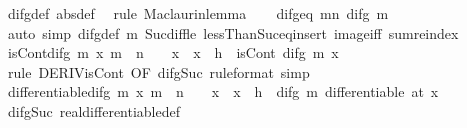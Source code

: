 \begin{isabellebody}
\ difg{\isacharunderscore}{\kern0pt}def\ {\isacharbrackleft}{\kern0pt}abs{\isacharunderscore}{\kern0pt}def{\isacharbrackright}{\kern0pt}\ \isamarkupfalse%
\ {\isacharparenleft}{\kern0pt}rule\ Maclaurin{\isacharunderscore}{\kern0pt}lemma{}{\isacharparenright}{\kern0pt}\isanewline
\ \ \isamarkupfalse%
\ difg{\isacharunderscore}{\kern0pt}eq{\isacharunderscore}{\kern0pt}{}{\isacharcolon}{\kern0pt}\ {\isachardoublequoteopen}{\isasymforall}m{\isacharless}{\kern0pt}n{\isachardot}{\kern0pt}\ difg\ m\ {}\ {\isacharequal}{\kern0pt}\ {}{\isachardoublequoteclose}\isanewline
\ \ \ \ \isamarkupfalse%
\ {\isacharparenleft}{\kern0pt}auto\ simp{\isacharcolon}{\kern0pt}\ difg{\isacharunderscore}{\kern0pt}def\ m\ Suc{\isacharunderscore}{\kern0pt}diff{\isacharunderscore}{\kern0pt}le\ lessThan{\isacharunderscore}{\kern0pt}Suc{\isacharunderscore}{\kern0pt}eq{\isacharunderscore}{\kern0pt}insert{\isacharunderscore}{\kern0pt}{}\ image{\isacharunderscore}{\kern0pt}iff\ sum{\isachardot}{\kern0pt}reindex{\isacharparenright}{\kern0pt}\isanewline
\ \ \isamarkupfalse%
\ isCont{\isacharunderscore}{\kern0pt}difg{\isacharcolon}{\kern0pt}\ {\isachardoublequoteopen}{\isasymAnd}m\ x{\isachardot}{\kern0pt}\ m\ {\isacharless}{\kern0pt}\ n\ {\isasymLongrightarrow}\ {}\ {\isasymle}\ x\ {\isasymLongrightarrow}\ x\ {\isasymle}\ h\ {\isasymLongrightarrow}\ isCont\ {\isacharparenleft}{\kern0pt}difg\ m{\isacharparenright}{\kern0pt}\ x{\isachardoublequoteclose}\isanewline
\ \ \ \ \isamarkupfalse%
\ {\isacharparenleft}{\kern0pt}rule\ DERIV{\isacharunderscore}{\kern0pt}isCont\ {\isacharbrackleft}{\kern0pt}OF\ difg{\isacharunderscore}{\kern0pt}Suc\ {\isacharbrackleft}{\kern0pt}rule{\isacharunderscore}{\kern0pt}format{\isacharbrackright}{\kern0pt}{\isacharbrackright}{\kern0pt}{\isacharparenright}{\kern0pt}\ simp\isanewline
\ \ \isamarkupfalse%
\ differentiable{\isacharunderscore}{\kern0pt}difg{\isacharcolon}{\kern0pt}\ {\isachardoublequoteopen}{\isasymAnd}m\ x{\isachardot}{\kern0pt}\ m\ {\isacharless}{\kern0pt}\ n\ {\isasymLongrightarrow}\ {}\ {\isasymle}\ x\ {\isasymLongrightarrow}\ x\ {\isasymle}\ h\ {\isasymLongrightarrow}\ difg\ m\ differentiable\ {\isacharparenleft}{\kern0pt}at\ x{\isacharparenright}{\kern0pt}{\isachardoublequoteclose}\isanewline
\ \ \ \ \isamarkupfalse%
\ difg{\isacharunderscore}{\kern0pt}Suc\ real{\isacharunderscore}{\kern0pt}differentiable{\isacharunderscore}{\kern0pt}def\ \isamarkupfalse%

\end{isabellebody}
